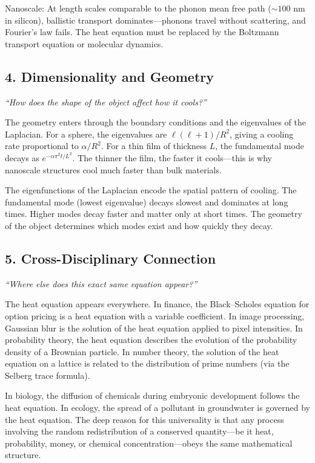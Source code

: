 \documentclass[11pt,openright]{book}
\begin{document}
Nanoscale: At length scales comparable to the phonon mean free path ($\sim 100$ nm in silicon), ballistic transport dominates---phonons travel without scattering, and Fourier's law fails. The heat equation must be replaced by the Boltzmann transport equation or molecular dynamics.

\subsection*{4. Dimensionality and Geometry}
\textit{``How does the shape of the object affect how it cools?''}

The geometry enters through the boundary conditions and the eigenvalues of the Laplacian. For a sphere, the eigenvalues are $\ell(\ell+1)/R^2$, giving a cooling rate proportional to $\alpha/R^2$. For a thin film of thickness $L$, the fundamental mode decays as $e^{-\alpha\pi^2 t/L^2}$. The thinner the film, the faster it cools---this is why nanoscale structures cool much faster than bulk materials.

The eigenfunctions of the Laplacian encode the spatial pattern of cooling. The fundamental mode (lowest eigenvalue) decays slowest and dominates at long times. Higher modes decay faster and matter only at short times. The geometry of the object determines which modes exist and how quickly they decay.

\subsection*{5. Cross-Disciplinary Connection}
\textit{``Where else does this exact same equation appear?''}

The heat equation appears everywhere. In finance, the Black--Scholes equation for option pricing is a heat equation with a variable coefficient. In image processing, Gaussian blur is the solution of the heat equation applied to pixel intensities. In probability theory, the heat equation describes the evolution of the probability density of a Brownian particle. In number theory, the solution of the heat equation on a lattice is related to the distribution of prime numbers (via the Selberg trace formula).

In biology, the diffusion of chemicals during embryonic development follows the heat equation. In ecology, the spread of a pollutant in groundwater is governed by the heat equation. The deep reason for this universality is that any process involving the random redistribution of a conserved quantity---be it heat, probability, money, or chemical concentration---obeys the same mathematical structure.
\end{document}
